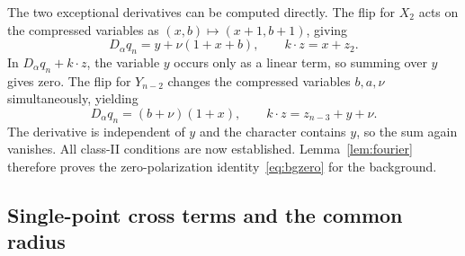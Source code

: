 \documentclass[11pt,a4paper]{article}
\numberwithin{equation}{section}
\theoremstyle{definition}
\begin{document}
The two exceptional derivatives can be computed directly. The flip for $X_2$ acts on the compressed variables as $(x,b)\mapsto(x+1,b+1)$, giving
\begin{equation}
 D_\alpha q_n=y+\nu(1+x+b),\qquad
 k\cdot z=x+z_2.
 \label{eq:derivative-X2}
\end{equation}
In $D_\alpha q_n+k\cdot z$, the variable $y$ occurs only as a linear term, so summing over $y$ gives zero. The flip for $Y_{n-2}$ changes the compressed variables $b,a,\nu$ simultaneously, yielding
\begin{equation}
 D_\alpha q_n=(b+\nu)(1+x),\qquad
 k\cdot z=z_{n-3}+y+\nu.
 \label{eq:derivative-Y}
\end{equation}
The derivative is independent of $y$ and the character contains $y$, so the sum again vanishes. All class-II conditions are now established. Lemma~\ref{lem:fourier} therefore proves the zero-polarization identity~\eqref{eq:bgzero} for the background.

\subsection{Single-point cross terms and the common radius}
\end{document}
